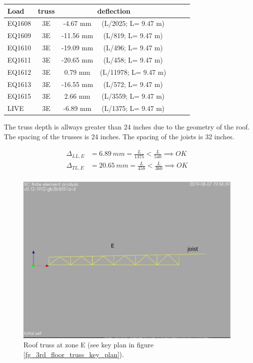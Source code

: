 \begin{center}
  \begin{scriptsize}
  \begin{tabular}{|l|c|c|c|c|c|c|}
    \hline
    \textbf{Load} & \textbf{truss} & \multicolumn{2}{c|}{\textbf{deflection}} \\
    \hline
EQ1608 & 3E & -4.67 mm & (L/2025; L= 9.47 m) \\
EQ1609 & 3E & -11.56 mm & (L/819; L= 9.47 m) \\
EQ1610 & 3E & -19.09 mm & (L/496; L= 9.47 m) \\
EQ1611 & 3E & -20.65 mm & (L/458; L= 9.47 m) \\
EQ1612 & 3E & 0.79 mm & (L/11978; L= 9.47 m) \\
EQ1613 & 3E & -16.55 mm & (L/572; L= 9.47 m) \\
EQ1615 & 3E & 2.66 mm & (L/3559; L= 9.47 m) \\
LIVE & 3E & -6.89 mm & (L/1375; L= 9.47 m) \\
\hline
  \end{tabular}
  \end{scriptsize}
\end{center}

\noindent The truss depth is allways greater than 24 inches due to the geometry of the roof. The spacing of the trusses is 24 inches. The spacing of the joists is 32 inches.

\begin{align}
\Delta_{LL,E} &= 6.89\ mm= \frac{L}{1375} < \frac{L}{540} \implies OK \\
\Delta_{TL,E} &= 20.65\ mm= \frac{L}{458} < \frac{L}{360} \implies OK \\
\end{align}

\begin{figure}
  \begin{center}
  \includegraphics[width=120mm]{figures/roof_truss_E}
  \end{center}
  \caption{Roof truss at zone E (see key plan in figure \ref{fg_3rd_floor_truss_key_plan}).}\label{fg_roof_truss_E}
\end{figure}

